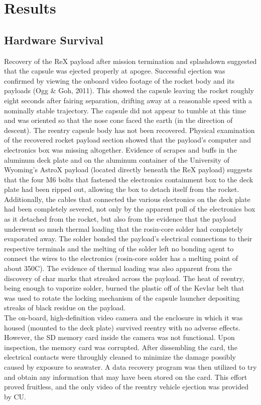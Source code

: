 \documentclass{article}
\begin{document}
\section{Results}
	\begin{doublespace}
	\subsection{Hardware Survival}
		\indent\indent Recovery of the ReX payload after mission termination and splashdown suggested that the capsule was ejected properly at apogee. Successful ejection was confirmed by viewing the onboard video footage of the rocket body and its payloads (Ogg \& Goh, 2011). This showed the capsule leaving the rocket roughly eight seconds after fairing separation, drifting away at a reasonable speed with a nominally stable trajectory. The capsule did not appear to tumble at this time and was oriented so that the nose cone faced the earth (in the direction of descent). The reentry capsule body has  not been recovered. Physical examination of the recovered rocket payload section showed that the payload's computer and electronics box was missing altogether. Evidence of scrapes and buffs in the aluminum deck plate and on the aluminum container of the University of Wyoming's AstroX payload (located directly beneath the ReX payload) suggests that the four M6 bolts that fastened the electronics containment box to the deck plate had been ripped out, allowing the box to detach itself from the rocket. Additionally, the cables that connected the various electronics on the deck plate had been completely severed, not only by the apparent pull of the electronics box as it detached from the rocket, but also from the evidence that the payload underwent so much thermal loading that the rosin-core solder had completely evaporated away. The solder bonded the payload's electrical connections to their respective terminals and the melting of the solder left no bonding agent to connect the wires to the electronics (rosin-core solder has a melting point of about 350\degree C). The evidence of thermal loading was also apparent from the discovery of char marks that streaked across the payload. The heat of reentry, being enough to vaporize solder, burned the plastic off of the Kevlar belt that was used to rotate the locking mechanism of the capsule launcher depositing streaks of black residue on the payload.\\
		\indent The on-board, high-definition video camera and the enclosure in which it was housed (mounted to the deck plate) survived reentry with no adverse effects. However, the SD memory card inside the camera was not functional. Upon inspection, the memory card was corrupted. After dissembling the card, the electrical contacts were throughly cleaned to minimize the damage possibly caused by exposure to seawater. A data recovery program was then utilized to try and obtain any information that may have been stored on the card. This effort proved fruitless, and the only video of the reentry vehicle ejection was provided by CU.

\end{doublespace}
\end{document}
